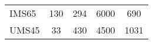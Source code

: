 \begin{table}[ht]
\begin{tabular}[t]{lcccc}
        \\
    IMS65
        &130 \cite{Kjell2011}
        &294 \cite{Kjell2011}
        &6000 \cite{Kjell2011}
        &690\cite{Kjell2011}
        \\
    UMS45
        &33 \cite{Kjell2011}
        &430 \cite{Kjell2011}
        &4500 \cite{Kjell2011}
        &1031 \cite{Kjell2011}
        \\
    \bottomrule
    \end{tabular}
\end{table}%